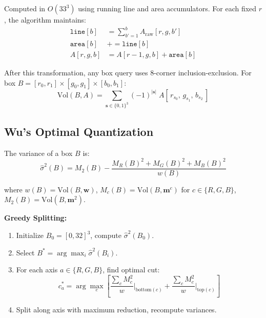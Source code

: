 \documentclass[11pt,a4paper]{article}
\begin{document}
Computed in $O(33^3)$ using running line and area accumulators.
For each fixed $r$, the algorithm maintains:
\begin{align}
  \texttt{line}[b] &= \sum_{b'=1}^{b} A_{\mathrm{raw}}[r,g,b'] \\
  \texttt{area}[b] &\mathrel{+}= \texttt{line}[b] \\
  A[r,g,b] &= A[r-1,g,b] + \texttt{area}[b]
\end{align}

After this transformation, any box query uses 8-corner inclusion-exclusion.
For box $B = [r_0, r_1] \times [g_0, g_1] \times [b_0, b_1]$:
\begin{equation}
  \mathrm{Vol}(B, A) = \sum_{\mathbf{s} \in \{0,1\}^3}
    (-1)^{|\mathbf{s}|} \; A\!\left[\, r_{s_0},\, g_{s_1},\, b_{s_2} \,\right]
\end{equation}

\subsection{Wu's Optimal Quantization}

The variance of a box $B$ is:
\begin{equation}
  \hat{\sigma}^2(B) = M_2(B)
    - \frac{M_R(B)^2 + M_G(B)^2 + M_B(B)^2}{w(B)}
\end{equation}

where $w(B) = \mathrm{Vol}(B, \mathbf{w})$,
$M_c(B) = \mathrm{Vol}(B, \mathbf{m}^c)$ for $c \in \{R,G,B\}$,
$M_2(B) = \mathrm{Vol}(B, \mathbf{m}^2)$.

\medskip
\noindent\textbf{Greedy Splitting:}
\begin{enumerate}
  \item Initialize $B_0 = [0,32]^3$, compute $\hat{\sigma}^2(B_0)$.
  \item Select $B^* = \arg\max_i \hat{\sigma}^2(B_i)$.
  \item For each axis $a \in \{R, G, B\}$, find optimal cut:
    \begin{equation}
      c^*_a = \arg\max_{c}
        \left[
          \frac{\sum_c M_c^2}{w}\bigg|_{\mathrm{bottom}(c)}
        + \frac{\sum_c M_c^2}{w}\bigg|_{\mathrm{top}(c)}
        \right]
    \end{equation}
  \item Split along axis with maximum reduction, recompute variances.
\end{enumerate}
\end{document}
